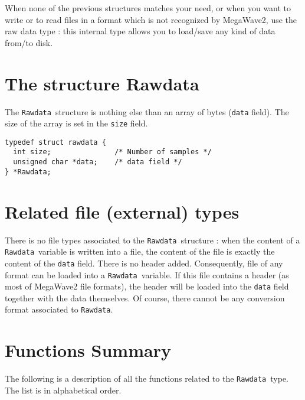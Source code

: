 %
%

When none of the previous structures matches your need, or when you want to
write or to read files in a format which is not recognized by MegaWave2, use
the raw data type : this internal type allows you to load/save 
any kind of data from/to disk.

\section{The structure Rawdata}

\def\rawdata{{\tt Rawdata}}
\index{structure!\rawdata}
\label{rawdata_structure}

The \rawdata\ structure is nothing else than an array of bytes (\verb+data+ field). The
size of the array is set in the \verb+size+ field.

{\small
\begin{verbatim}
typedef struct rawdata {
  int size;               /* Number of samples */
  unsigned char *data;    /* data field */
} *Rawdata;
\end{verbatim}
}

\section{Related file (external) types}
\label{rawdata-file_type}

There is no file types associated to the \rawdata\ structure : when the content of a \rawdata\ 
variable is written into a file, the content of the file is exactly the content of the \verb+data+
field. There is no header added. Consequently, file of any format can be loaded into a \rawdata\
variable. If this file contains a header (as most of MegaWave2 file formats), the header will
be loaded into the \verb+data+ field together with the data themselves.
Of course, there cannot be any conversion format associated to \rawdata.

\section{Functions Summary}
\label{rawdata_function}

The following is a description of all the functions related to 
the \rawdata\ type. The list is in alphabetical order.

\newpage %


